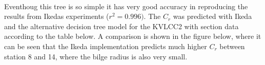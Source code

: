     \begin{center}
    \end{center}
    { \hspace*{\fill} \\}
    
    Eventhoug this tree is so simple it has very good accuracy in
reproducing the results from Ikedas experiments (\(r^2=0.996)\). The
\(C_r\) was predicted with Ikeda and the alternative decision tree model
for the KVLCC2 with section data according to the table below. A
comparison is shown in the figure below, where it can be seen that the
Ikeda implementation predicts much higher \(C_r\) between station 8 and
14, where the bilge radius is also very small.
 
            
    
